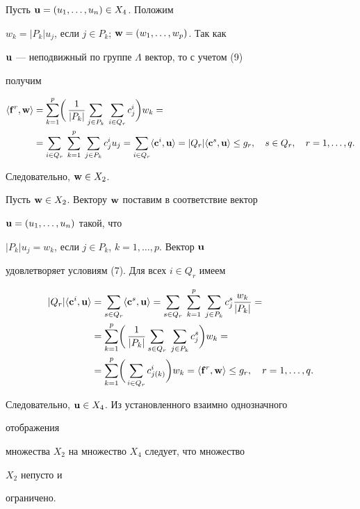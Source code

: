 \begin{pf}
\begin{equation}
\end{equation}





Пусть $\bold u=(u_1,\dotsc,u_n)\in X_4$. Положим


$w_k=|P_k|u_j$, если $j\in P_k$; $\bold w=(w_1,\dotsc,w_p)$. Так как


$\bold u$ --- неподвижный по группе $\Lambda$ вектор, то с учетом (9)


получим


\begin{align*}


\la\bold f^r,\bold w\ra&=\sum^p_{k=1}\biggl(\,\frac{1}{|P_k|}


\sum_{j\in P_k}\;\sum_{i\in Q_r}c^i_j\biggr)w_k=\\


&=\sum_{i\in Q_r}\;\sum^p_{k=1}\;\sum_{j\in P_k}c^i_ju_j=


\sum_{i\in Q_r}\la\bold c^i,\bold u\ra=


|Q_r|\la\bold c^s,\bold u\ra\le g_r,\quad s\in Q_r,\quad


r=1,\dotsc,q.


\end{align*}


Следовательно, $\bold w\in X_2$.





Пусть $\bold w\in X_2$. Вектору $\bold w$ поставим в соответствие вектор


$\bold u=(u_1,\dotsc,u_n)$ такой, что


$|P_k|u_j=w_k$, если $j\in P_k$, $k=1,\dotsc,p$. Вектор $\bold u$


удовлетворяет условиям (7). Для всех $i\in Q_r$ имеем


\begin{align*}


|Q_r|\la\bold c^i,\bold u\ra&=\sum_{s\in Q_r}\la\bold c^s,\bold u\ra=


\sum_{s\in Q_r}\;\sum^p_{k=1}\;\sum_{j\in P_k}c^s_j


\frac{w_k}{|P_k|}=\\


&=\sum^p_{k=1}\biggl(\,\frac{1}{|P_k|}\sum_{s\in Q_r}\;


\sum_{j\in P_k}c^s_j\biggr)w_k=\\


&=\sum^p_{k=1}\biggl(\,\sum_{i\in Q_r}c^i_{j(k)}\biggr)w_k=


\la\bold f^r,\bold w\ra\le g_r,\quad r=1,\dotsc,q.


\end{align*}


Следовательно, $\bold u\in X_4$. Из установленного взаимно однозначного


отображения


множества $X_2$ на множество $X_4$ следует, что множество


$X_2$ непусто и


ограничено.


\end{pf}





